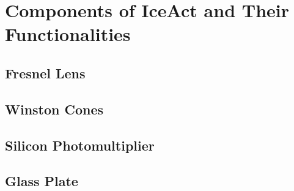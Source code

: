 \chapter{Components of IceAct and Their Functionalities}

\section{Fresnel Lens}

\section{Winston Cones}

\section{Silicon Photomultiplier}

\section{Glass Plate}


